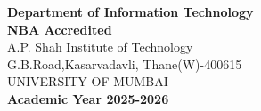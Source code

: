 \begin{titlepage}
{\hspace{.04cm}
\hspace{.04cm}

{\textbf {Department of Information Technology}}\\
\textbf{\textsf{NBA Accredited}}\\
A.P. Shah Institute of Technology\\
G.B.Road,Kasarvadavli, Thane(W)-400615\\
UNIVERSITY OF MUMBAI\\
\vspace{0.2cm}
\textbf{Academic Year 2025-2026}\\
}
\end{titlepage}